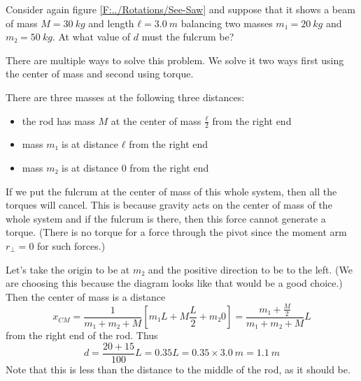 \begin{example}
\label{Eg:SeeSaw2} 
Consider again figure \ref{F:../Rotations/See-Saw} and suppose that it shows a beam of mass $M=30\ kg$ and length $ℓ=3.0\ m$ balancing two masses $m₁ = 20\ kg$ and $m₂ = 50\ kg$. At what value of $d$ must the fulcrum be?
\begin{solution}
There are multiple ways to solve this problem. We solve it two ways first using the center of mass and second using torque.

There are three masses at the following three distances:
\begin{itemize}
	\item the rod has mass $M$ at the center of mass $\frac ℓ2$ from the right end
	\item mass $m₁$ is at distance $ℓ$ from the right end
	\item mass $m₂$ is at distance $0$ from the right end
\end{itemize}
If we put the fulcrum at the center of mass of this whole system, then all the torques will cancel. This is because gravity acts on the center of mass of the whole system and if the fulcrum is there, then this force cannot generate a torque. (There is no torque for a force through the pivot since the moment arm $r_⊥ =0$ for such forces.)

Let's take the origin to be at $m₂$ and the positive direction to be to the left. (We are choosing this because the diagram looks like that would be a good choice.)
Then the center of mass is a distance 
$$
x_{CM} = \frac1{m₁ +m₂ +M} \left[ m₁ L + M\frac L2 + m₂ 0\right]
	= \frac{m₁ +\frac M2}{m₁ +m₂ +M} L
$$
from the right end of the rod. Thus
$$
d =  \frac{20 +15}{100} L = 0.35 L= 0.35 × 3.0\ m = 1.1\ m
$$
Note that this is less than the distance to the middle of the rod, as it should be.


\end{solution}
\end{example}
